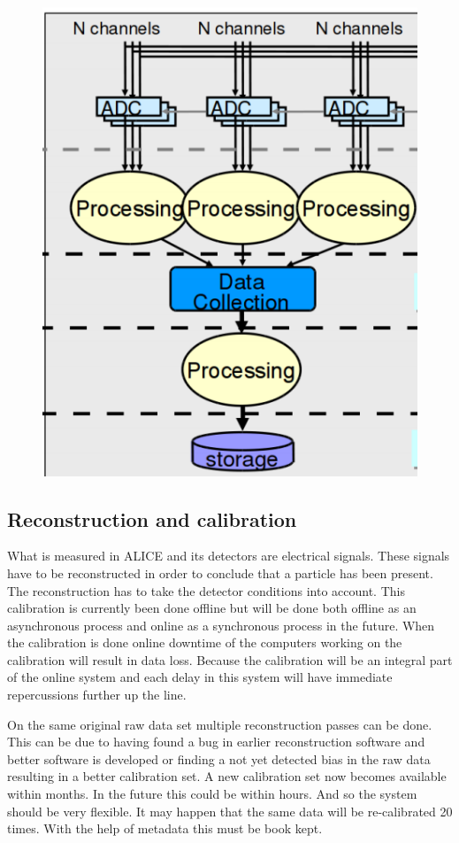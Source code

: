\begin{figure}
  \begin{center}
    \includegraphics[scale=0.3]{./images/daq.png}
    \caption{}
    \label{fig:}
  \end{center}
\end{figure}

\subsection{Reconstruction and calibration}
What is measured in ALICE and its detectors are electrical signals. These signals have to be reconstructed in order to conclude that a particle has been present. The reconstruction has to take the detector conditions into account. This calibration is currently been done offline but will be done both offline as an asynchronous process and online as a synchronous process in the future. When the calibration is done online downtime of the computers working on the calibration will result in data loss. Because the calibration will be an integral part of the online system and each delay in this system will have immediate repercussions further up the line.

On the same original raw data set multiple reconstruction passes can be done. This can be due to having found a bug in earlier reconstruction software and better software is developed or finding a not yet detected bias in the raw data resulting in a better calibration set. A new calibration set now becomes available within months. In the future this could be within hours. And so the system should be very flexible. It may happen that the same data will be re-calibrated 20 times. With the help of metadata this must be book kept.

